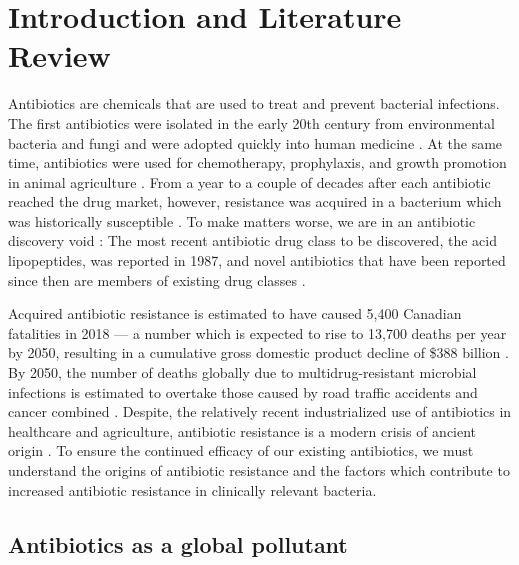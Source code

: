\chapter{Introduction and Literature Review}

Antibiotics are chemicals that are used to treat and prevent bacterial infections.
The first antibiotics were isolated in the early 20th century from environmental bacteria and fungi and were adopted quickly into human medicine \parencite{Hutchings.2019}.
At the same time, antibiotics were used for chemotherapy, prophylaxis, and growth promotion in animal agriculture \parencite{Kirchhelle.2018}.
From a year to a couple of decades after each antibiotic reached the drug market, however, resistance was acquired in a bacterium which was historically susceptible \parencite{Ventola.2015}.
To make matters worse, we are in an antibiotic discovery void \parencite{Silver.2011}:
The most recent antibiotic drug class to be discovered, the acid lipopeptides, was reported in 1987, and novel antibiotics that have been reported since then are members of existing drug classes \parencite{Debono.1987}.

Acquired antibiotic resistance is estimated to have caused 5,400 Canadian fatalities in 2018 --- a number which is expected to rise to 13,700 deaths per year by 2050, resulting in a cumulative gross domestic product decline of \$388 billion \parencite{Finlay.2019}.
By 2050, the number of deaths globally due to multidrug-resistant microbial infections is estimated to overtake those caused by road traffic accidents and cancer combined \parencite{ONeill.2016}. Despite, the relatively recent industrialized use of antibiotics in healthcare and agriculture, antibiotic resistance is a modern crisis of ancient origin \parencite{DCosta.2011}.
To ensure the continued efficacy of our existing antibiotics, we must understand the origins of antibiotic resistance and the factors which contribute to increased antibiotic resistance in clinically relevant bacteria.

\section{Antibiotics as a global pollutant}

